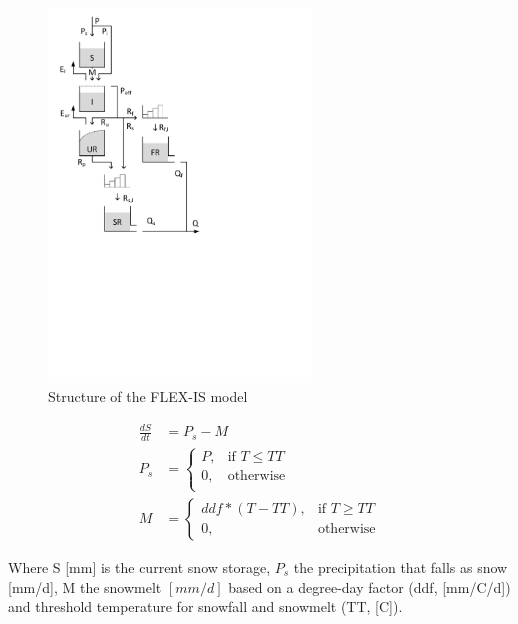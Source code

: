 { 																	%
\begin{figure}
\includegraphics[trim=1cm 12cm 7cm 1cm,width=7cm,keepaspectratio]{./AppA_files/34_schematic.pdf}
\caption{Structure of the FLEX-IS model} \label{fig:34_schematic}
\end{figure}

\begin{align}
	\frac{dS}{dt} &= P_s-M \\
	P_s &= \begin{cases}
		P, &\text{if } T \leq TT \\
		0, & \text{otherwise} \\
	\end{cases} \\
	M &= 
	\begin{cases}
		ddf*(T - TT), & \text{if } T \geq TT \\
		0, & \text{otherwise}
	\end{cases}
\end{align}

Where S [mm] is the current snow storage, $P_s$ the precipitation that falls as snow [mm/d], M the snowmelt $[mm/d]$ based on a degree-day factor (ddf, [mm/\degree C/d]) and threshold temperature for snowfall and snowmelt (TT, [\degree C]).


}
